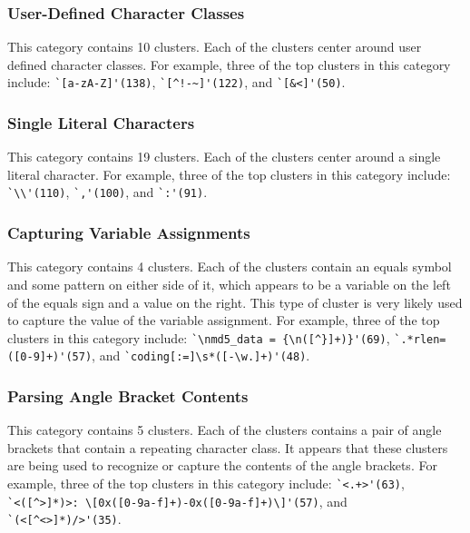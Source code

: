 \subsubsection{User-Defined Character Classes}
This category contains 10 clusters. Each of the clusters center around user defined character classes. For example, three of the top clusters in this category include:
\verb!`[a-zA-Z]'(138)!, \verb•`[^!-~]'(122)•, and \verb!`[&<]'(50)!.

\subsubsection{Single Literal Characters}
This category contains 19 clusters. Each of the clusters center around a single literal character. For example, three of the top clusters in this category include:
\verb!`\\'(110)!, \verb!`,'(100)!, and \verb!`:'(91)!.

\subsubsection{Capturing Variable Assignments}
This category contains 4 clusters. Each of the clusters contain an equals symbol and some pattern on either side of it, which appears to be a variable on the left of the equals sign and a value on the right.  This type of cluster is very likely used to capture the value of the variable assignment. For example, three of the top clusters in this category include:
\verb!`\nmd5_data = {\n([^}]+)}'(69)!, \verb!`.*rlen=([0-9]+)'(57)!, and \verb!`coding[:=]\s*([-\w.]+)'(48)!.

\subsubsection{Parsing Angle Bracket Contents}
This category contains 5 clusters. Each of the clusters contains a pair of angle brackets that contain a repeating character class.  It appears that these clusters are being used to recognize or capture the contents of the angle brackets.  For example, three of the top clusters in this category include:
\verb!`<.+>'(63)!, \verb!`<([^>]*)>: \[0x([0-9a-f]+)-0x([0-9a-f]+)\]'(57)!, and \verb!`(<[^<>]*)/>'(35)!. %

